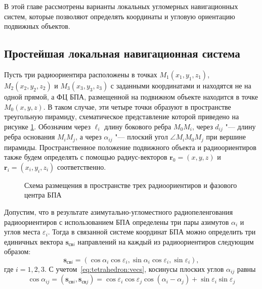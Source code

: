 \documentclass[../main.tex]{subfiles}
\begin{document}
В этой главе рассмотрены варианты локальных угломерных навигационных систем, которые позволяют определять координаты и угловую ориентацию подвижных объектов.

%
%
%
\subsection{Простейшая локальная навигационная система}
Пусть три радиоориентира расположены в точках $M_1\left(x_1, y_1, z_1\right)$, $M_2\left(x_2, y_2, z_2\right)$ и $M_3\left(x_3, y_3, z_3\right)$ с заданными координатами и находятся не на одной прямой, а ФЦ БПА, размещенной на подвижном объекте находится в точке $M_0\left(x, y, z\right)$. В таком случае, эти четыре точки образуют в пространстве треугольную пирамиду, схематическое представление которой приведено на рисунке \ref{fig:tetrahedron:pic1}. Обозначим через $\ell_i$ длину бокового ребра $M_0M_i$, через $d_{ij}$ "--- длину ребра основания $M_iM_j$, а через $\alpha_{ij}$ "--- плоский угол $\angle M_iM_0M_j$ при вершине пирамиды. Пространственное положение подвижного объекта и радиоориентиров также будем определять с помощью радиус-векторов $\mathbf{r}_0 = \left(x, y, z\right)$ и $\mathbf{r}_i = \left(x_i, y_i, z_i\right)$ соответственно.

\begin{figure}[htbp]
    \centering


    \caption{Схема размещения в пространстве трех радиоориентиров и фазового центра БПА}
    \label{fig:tetrahedron:pic1}
\end{figure}

Допустим, что в результате азимутально-угломестного радиопеленгования радиоориентиров с использованием БПА определены три пары азимутов $\alpha_{i}$ и углов места $\varepsilon_{i}$. Тогда в связанной системе координат БПА можно определить три единичных вектора $\mathbf{s}_{\text{св}i}$ направлений на каждый из радиоориентиров следующим образом:
\begin{equation}\label{eq:tetrahedron:vecs}
    \mathbf{s}_{\text{св}i} = \left(\cos\alpha_i \cos\varepsilon_i, \sin\alpha_i\cos\varepsilon_i, \sin\varepsilon_i\right),
\end{equation}
где $i = 1,2,3$. С учетом~\eqref{eq:tetrahedron:vecs}, косинусы плоских углов $\alpha_{ij}$ равны
\begin{equation}
    \cos\alpha_{ij} = \left(\mathbf{s}_{\text{св}i}, \mathbf{s}_{\text{св}j}\right) =
    \cos\varepsilon_i \cos\varepsilon_j \cos\left(\alpha_i - \alpha_j\right) + \sin\varepsilon_i \sin\varepsilon_j
\end{equation}
\end{document}
